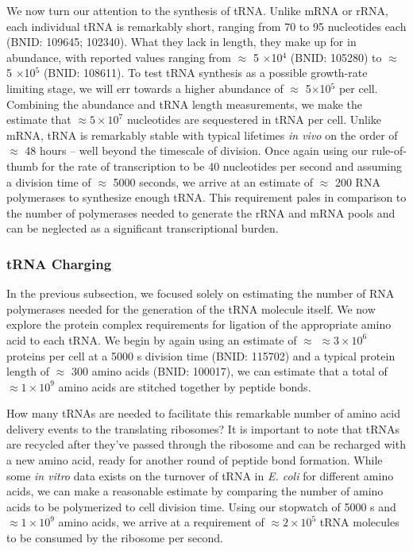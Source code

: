 We now turn our attention to the synthesis of tRNA. Unlike mRNA or rRNA, each
individual tRNA is remarkably short, ranging from 70 to 95 nucleotides each
(BNID: 109645; 102340). What they lack in length, they make up for in
abundance, with reported values ranging from $\approx$ 5 $\times$10$^4$ (BNID:
105280) to $\approx$ 5 $\times$10$^5$ (BNID: 108611). To test tRNA synthesis as
a possible growth-rate limiting stage, we will err towards a higher abundance
of $\approx$ 5$\times$10$^5$ per cell. Combining the abundance and tRNA
length measurements, we make the estimate that $\approx 5 \times 10^7$
nucleotides are sequestered in tRNA per cell. Unlike mRNA, tRNA is remarkably
stable with typical lifetimes \textit{in vivo} on the order of $\approx$ 48
hours \citep{abelson1974,svenningsen2017} -- well beyond the timescale of
division. Once again using our rule-of-thumb for the rate of transcription to
be 40 nucleotides per second and assuming a division time of $\approx$ 5000
seconds, we arrive at an estimate of $\approx$ 200 RNA polymerases to
synthesize enough tRNA. This requirement pales in comparison to the number of
polymerases needed to generate the rRNA and mRNA pools and can be neglected
as a significant transcriptional burden.

\subsubsection{tRNA Charging}
In the previous subsection, we focused solely on estimating the number of RNA
polymerases needed for the generation of the tRNA molecule itself. We now
explore the protein complex requirements for ligation of the appropriate
amino acid to each tRNA. We begin by again using an estimate of $\approx$
$\approx 3\times 10^{6}$ proteins per cell at a 5000 s division time (BNID: 115702)
and a typical protein length of $\approx$ 300 amino acids (BNID: 100017), we
can estimate that a total of $\approx 1\times 10^{9}$ amino acids are stitched
together by peptide bonds.

How many tRNAs are needed to facilitate this remarkable number of amino acid
delivery events to the translating ribosomes? It is important to note that
tRNAs are recycled after they've passed through the ribosome and can be
recharged with a new amino acid, ready for another round of peptide bond
formation. While some \textit{in vitro} data exists on the turnover of tRNA
in \textit{E. coli} for different amino acids, we can make a reasonable
estimate by comparing the number of amino acids to be polymerized to cell
division time. Using our stopwatch of 5000 s and $\approx 1\times 10^{9}$ amino acids, we
arrive at a requirement of $\approx 2\times 10^{5}$ tRNA molecules to be
consumed by the ribosome per second.

